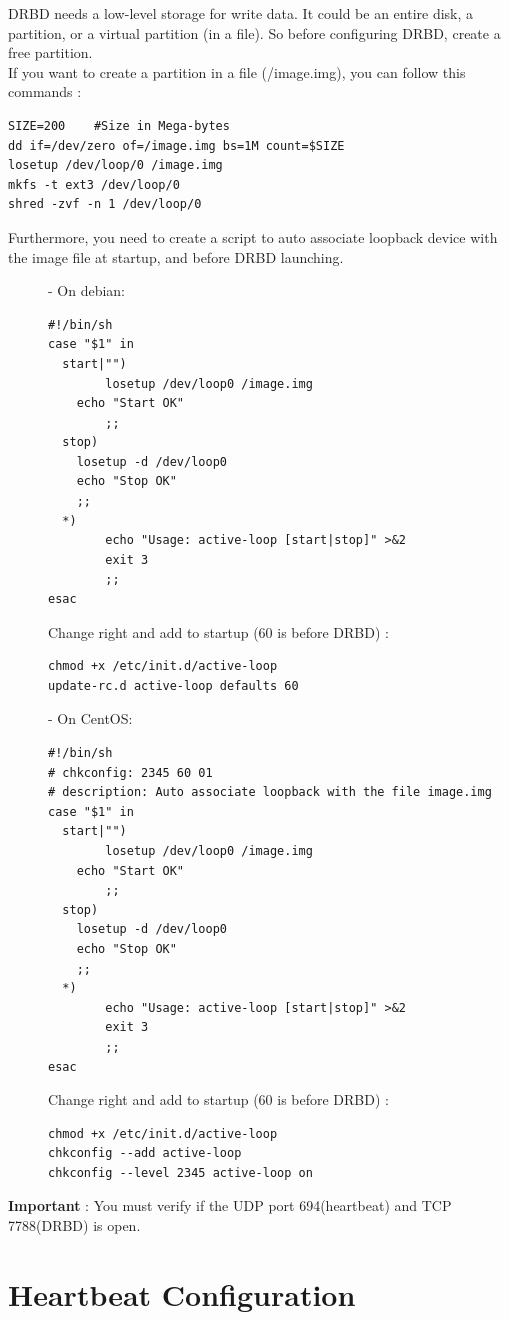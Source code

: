 \documentclass[a4paper,10pt]{report}
\begin{document}
DRBD needs a low-level storage for write data. It could be an entire disk, a partition, or a virtual partition (in a file). So before configuring DRBD, create a free partition.\\
If you want to create a partition in a file (/image.img), you can follow this commands :
\begin{lstlisting}
SIZE=200	#Size in Mega-bytes
dd if=/dev/zero of=/image.img bs=1M count=$SIZE
losetup /dev/loop/0 /image.img
mkfs -t ext3 /dev/loop/0
shred -zvf -n 1 /dev/loop/0	
\end{lstlisting}
Furthermore, you need to create a script to auto associate loopback device with the image file at startup, and before DRBD launching.
\begin{description}
\item[]- On debian:
\begin{lstlisting}
#!/bin/sh
case "$1" in
  start|"") 
        losetup /dev/loop0 /image.img
	echo "Start OK"
        ;;
  stop)
	losetup -d /dev/loop0
	echo "Stop OK"
	;;
  *)
        echo "Usage: active-loop [start|stop]" >&2
        exit 3
        ;;
esac
\end{lstlisting}
Change right and add to startup (60 is before DRBD) :
\begin{lstlisting}
chmod +x /etc/init.d/active-loop
update-rc.d active-loop defaults 60
\end{lstlisting}

\item[]- On CentOS:
\begin{lstlisting}
#!/bin/sh
# chkconfig: 2345 60 01
# description: Auto associate loopback with the file image.img
case "$1" in
  start|"") 
        losetup /dev/loop0 /image.img
	echo "Start OK"
        ;;
  stop)
	losetup -d /dev/loop0
	echo "Stop OK"
	;;
  *)
        echo "Usage: active-loop [start|stop]" >&2
        exit 3
        ;;
esac
\end{lstlisting}
Change right and add to startup (60 is before DRBD) :
\begin{lstlisting}
chmod +x /etc/init.d/active-loop
chkconfig --add active-loop
chkconfig --level 2345 active-loop on
\end{lstlisting}
\end{description}

\textbf{Important} : You must verify if the UDP port 694(heartbeat) and TCP 7788(DRBD) is open.

\section{Heartbeat Configuration}
\end{document}
